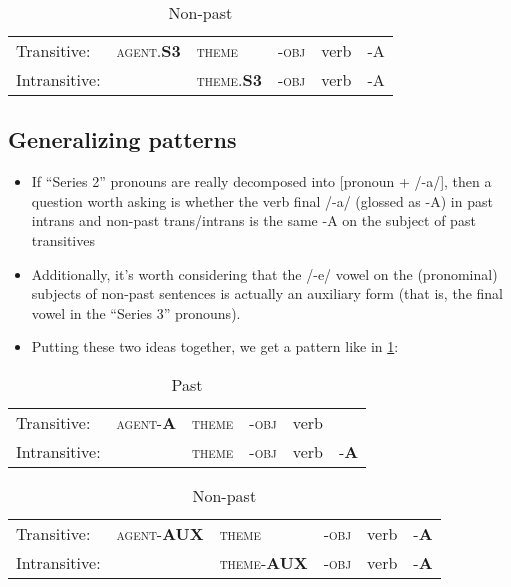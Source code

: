\documentclass{assets/fieldnotes}
\begin{document}
\begin{table}[!htb]
  \centering
  \caption{Non-past}
  \begin{tabular}{llllll}
    \midrule
    {{Transitive:}}   & \textsc{agent}.\textbf{S3} & \textsc{theme}             & -\textsc{obj} & verb & -A \\
    {{Intransitive:}} &                            & \textsc{theme}.\textbf{S3} & -\textsc{obj} & verb & -A \\
    \midrule
  \end{tabular}
\end{table}

\subsection*{Generalizing patterns}

\begin{itemize}[label=$\bullet$, left=0mm, labelsep=2mm,itemsep=0pt,topsep=3pt, rightmargin=0cm]
  \item If ``Series 2'' pronouns are really decomposed into [pronoun + /-a/], then a question worth asking is whether the verb final /-a/ (glossed as -A) in past intrans and non-past trans/intrans is the same -A on the subject of past transitives

  \item Additionally, it's worth considering that the /-e/ vowel on the (pronominal) subjects of non-past sentences is actually an auxiliary form (that is, the final vowel in the ``Series 3'' pronouns).

  \item Putting these two ideas together, we get a pattern like in \ref{tab:trans-intrans-organized}:
\end{itemize}

\begin{table}[!htb]
  \centering
  \caption{Past}
  \label{tab:trans-intrans-organized}
  \begin{tabular}{llllll}
    \midrule
    { {Transitive:}}   & \textsc{agent}-\textbf{A} & \textsc{theme} & -\textsc{obj} & verb           \\
    { {Intransitive:}} &                       & \textsc{theme} & -\textsc{obj} & verb & -\textbf{A} \\
    \midrule
  \end{tabular}
\end{table}

\begin{table}[!htb]
  \centering
  \caption{Non-past}
  \begin{tabular}{llllll}
    \midrule
    {{Transitive:}}   & \textsc{agent}-\textbf{AUX} & \textsc{theme}          & -\textsc{obj} & verb & -\textbf{A}     \\
    {{Intransitive:}} &                         & \textsc{theme}-\textbf{AUX} & -\textsc{obj} & verb & -\textbf{A} \\
    \midrule
  \end{tabular}
\end{table}
\end{document}
